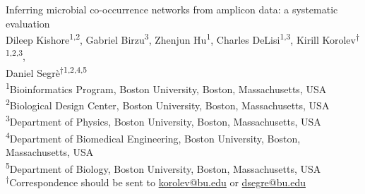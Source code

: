 
\begin{titlepage}

  \newcommand{\HRule}{\rule{\linewidth}{0.5mm}} %

  \center %





  \vspace*{\fill}
  {\huge Inferring microbial co-occurrence networks from amplicon data: a systematic evaluation}\\[0.4cm]


  \vspace{1.5 cm}
  Dileep Kishore\textsuperscript{1,2},
  Gabriel Birzu\textsuperscript{3},
  Zhenjun Hu\textsuperscript{1},
  Charles DeLisi\textsuperscript{1,3},
  Kirill Korolev\textsuperscript{$\dagger$1,2,3},\\
  Daniel Segr\`{e}\textsuperscript{$\dagger$1,2,4,5}\\
  \vspace{1cm}
  \textsuperscript{1}Bioinformatics Program, Boston University, Boston, Massachusetts, USA\\
  \textsuperscript{2}Biological Design Center, Boston University, Boston, Massachusetts, USA\\
  \textsuperscript{3}Department of Physics, Boston University, Boston, Massachusetts, USA\\
  \textsuperscript{4}Department of Biomedical Engineering, Boston University, Boston, Massachusetts, USA\\
  \textsuperscript{5}Department of Biology, Boston University, Boston, Massachusetts, USA\\
  \textsuperscript{$\dagger$}Correspondence should be sent to \href{mailto:korolev@bu.edu}{korolev@bu.edu} or \href{mailto:dsegre@bu.edu}{dsegre@bu.edu}\\


\end{titlepage}
